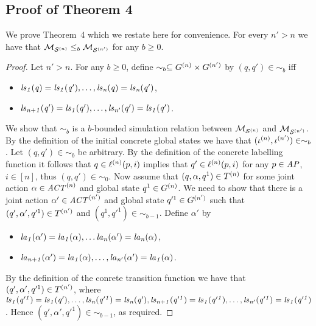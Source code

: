 \documentclass{article}
\newenvironment{customthm}[1]
  {\renewcommand\theinnercustomthm{#1}\innercustomthm}
  {\endinnercustomthm}
\begin{document}
\subsection*{Proof of Theorem 4}
We prove Theorem~4 which we restate here for convenience.
\begin{customthm}{4}
For every $n' > n$ we have that $\mathcal{M}_{\mathcal{S}^{(n)}} \leq_b \mathcal{M}_{\mathcal{S}^{(n')}}$ for any $b \geq 0$.
\end{customthm}
\begin{proof}
Let $n' > n$. For any $b \geq 0$, define $\sim_b \subseteq G^{(n)}
    \times G^{(n')}$ by $(q,q') \in \sim_b$ iff 
\begin{itemize}
    \item $\it{ls}_{1}(q) = \it{ls}_{1}(q'), \ldots, \it{ls}_{n}(q) = \it{ls}_{n}(q')$,
    \item $\it{ls}_{n+1}(q')=\it{ls}_{1}(q'), \ldots, \it{ls}_{n'}(q')=\it{ls}_{1}(q')$.
\end{itemize}
We show that $\sim_b$ is a $b$-bounded simulation relation between $\mathcal{M}_{\mathcal{S}^{(n)}}$
    and $\mathcal{M}_{\mathcal{S}^{(n')}}$. By the definition of the initial concrete global states we
    have that $(\iota^{({n})}, \iota^{({n'})}) \in \sim_b$. Let $(q, q') \in
    \sim_b$ be arbitrary. By the definition of the concrete labelling function
    it follows that $q \in \ell^{(n)}(p, i)$ implies that $q' \in \ell^{(n)}(p, i)$ for any $p \in \it{AP}$, $i \in [n]$, thus $(q, q') \in \sim_0$.
    Now assume that $(q, \alpha, q^1) \in T^{(n)}$ for some joint action
    $\alpha \in \mathit{ACT}^{(n)}$ and global state $q^1 \in G^{(n)}$. We
    need to show that there is a joint action $\alpha' \in \mathit{ACT}^{(n')}$ and
    global state $q'^1 \in G^{(n')}$ such that $(q', \alpha', q'^1)
    \in T^{(n')}$ and  $(q^1, q'^1) \in \sim_{b-1}$.  Define $\alpha'$ by 
    \begin{itemize}
        \item $\it{la}_{1}({\alpha'}) = \it{la}_{1}({\alpha}), \ldots \it{la}_{n}({\alpha'})=\it{la}_{n}({\alpha})$,
        \item $\it{la}_{n+1}({\alpha'}) = \it{la}_{1}({\alpha}), \ldots, \it{la}_{n'}({\alpha'}) = \it{la}_{1}({\alpha})$.
    \end{itemize}
    By the definition of the conrete transition function we have that $(q',
    \alpha', q'^1) \in T^{(n')}$, where $\it{ls}_{1}(q'^1) = \it{ls}_{1}(q'),
    \ldots, \it{ls}_{n}(q'^1)=\it{ls}_{n}(q'),
    \it{ls}_{n+1}(q'^1)=\it{ls}_{1}(q'^1),\ldots,\it{ls}_{n'}(q'^1)=\it{ls}_{1}(q'^1)$. Hence $(q',
    \alpha', q'^1) \in \sim_{b-1}$, as required.
\end{proof}





\end{document}
